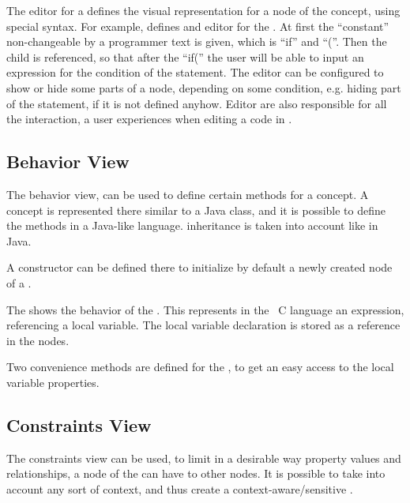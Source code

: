 
The editor for a  defines the visual representation for a node of the concept, using special syntax. For example,  defines
and editor for the . At first the ``constant'' non-changeable by a programmer text is given, which is ``if'' and ``(''. Then
the child  is referenced, so that after the ``if('' the user will be able to input an expression for the condition of the  statement.
The editor can be configured to show or hide some parts of a node, depending on some condition, e.g. hiding  part of the  statement, if it 
is not defined anyhow. Editor are also responsible for all the interaction, a user experiences when editing a code in \jbmps.

\subsection{Behavior View}
The behavior view, can be used to define certain methods for a concept. A concept is represented there similar to a Java class, and
it is possible to define the methods in a Java-like language.  inheritance is taken into account like in Java. 

A  constructor can be defined there to initialize by default a newly created node of a .


The  shows the behavior of the  . This  represents in the
\mbp\ C language an expression, referencing a local variable. The local variable declaration is stored as a reference 
in the  nodes.

Two convenience methods are defined for the  , to get an easy access to the local variable properties.


\subsection{Constraints View}
The constraints view can be used, to limit in a desirable way  property values and relationships, a node of the  can 
have to other nodes. It is possible to take into account any sort of context, and thus create a context-aware/sensitive .

